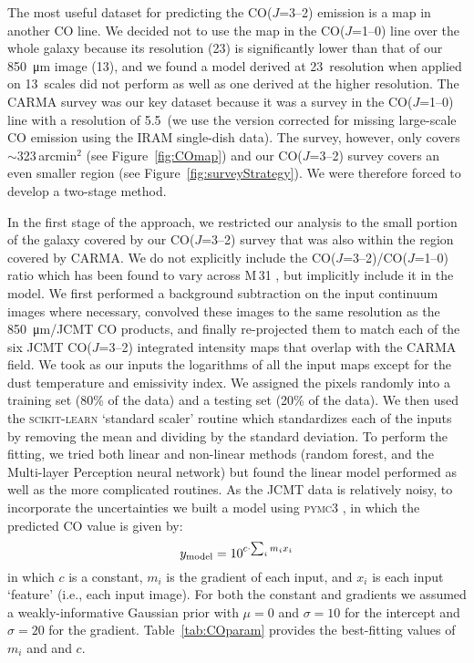 \documentclass[a4paper,fleqn,usenatbib, twocolumn]{aastex63}
\begin{document}
The most useful dataset for predicting the CO($J$=3--2) emission is a map in another CO line.
We decided not to use the map in the CO($J$=1--0) line 
over the whole galaxy \citep{Nieten2006} because its
resolution (23\arcsec) 
is significantly lower than that of our  \SI{850}{\micro\meter} image (13\arcsec), and we found a model derived at 23\arcsec\ resolution 
when applied on 13\arcsec\ scales did not perform as well as one derived at the higher resolution.
The CARMA survey was our key dataset
because it was a survey in the CO($J$=1--0)
line with a resolution of 5.5\arcsec\ (we use the version corrected for missing large-scale CO emission using the IRAM single-dish data). 
The survey, however, only covers $\sim$323\,arcmin$^2$ (see Figure~\ref{fig:COmap}) and
our CO($J$=3--2) survey covers an even smaller region (see Figure~\ref{fig:surveyStrategy}). We were
therefore forced to develop a two-stage method.

In the first stage of the approach, we restricted
our analysis to the small portion of the galaxy
covered by our CO($J$=3--2) survey that was also within
the region covered by CARMA. We do not explicitly include the CO($J$=3--2)/CO($J$=1--0) ratio which has been found to vary across M\,31 \citep{Li2020}, but
implicitly include it in the model. 
We first performed a background subtraction on the input continuum images where necessary, convolved these images to the same resolution as the \SI{850}{\micro\meter}/JCMT CO products, and finally re-projected them to match each of the six JCMT CO($J$=3--2) integrated intensity maps that overlap with the CARMA field. We took as our inputs the logarithms
of all the input maps except for the dust temperature and 
emissivity index. We assigned the pixels randomly
into a training set (80\% of the data) and
a testing set (20\% of the data). We then used the \textsc{scikit-learn} \citep{scikit-learn} `standard scaler' routine which standardizes each of the inputs by removing the mean and dividing by the standard deviation. To perform the fitting, we tried both linear and non-linear methods (random forest, 
and the Multi-layer Perception neural network) but found the linear model performed as well as the more complicated routines. As the JCMT data is relatively noisy, to incorporate the uncertainties we built a model using \textsc{pymc3} \citep{pymc3}, in which the predicted CO value is given by:
\begin{equation}
y_{\rm model} = 10^{c\cdot \sum_i m_i x_i }
\label{equ:COmodel}
\end{equation}
in which $c$ is a constant, $m_i$ is the gradient of each input, and $x_i$ is each input `feature' (i.e., each input image). For both the constant and gradients we
assumed a weakly-informative Gaussian prior with $\mu = 0$ and $\sigma=10$ for the intercept and $\sigma = 20$ for the gradient.
Table~\ref{tab:COparam} provides the best-fitting values of $m_i$ and and $c$.
\end{document}
